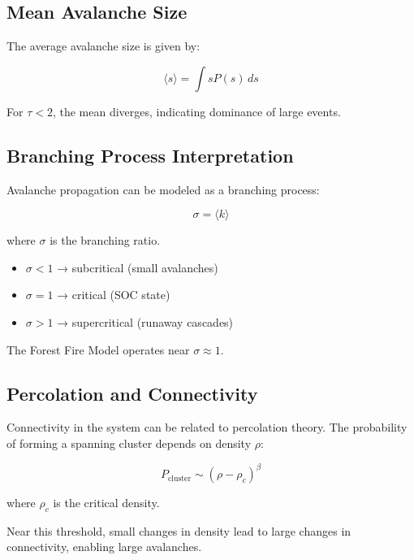 \documentclass[12pt,a4paper]{article}
\begin{document}
\subsection{Mean Avalanche Size}

The average avalanche size is given by:

\begin{equation}
\langle s \rangle = \int s P(s)\, ds
\end{equation}

For $\tau < 2$, the mean diverges, indicating dominance of large events.

\subsection{Branching Process Interpretation}

Avalanche propagation can be modeled as a branching process:

\begin{equation}
\sigma = \langle k \rangle
\end{equation}

where $\sigma$ is the branching ratio.

\begin{itemize}
\item $\sigma < 1$ → subcritical (small avalanches)
\item $\sigma = 1$ → critical (SOC state)
\item $\sigma > 1$ → supercritical (runaway cascades)
\end{itemize}

The Forest Fire Model operates near $\sigma \approx 1$.

\subsection{Percolation and Connectivity}

Connectivity in the system can be related to percolation theory. The probability of forming a spanning cluster depends on density $\rho$:

\begin{equation}
P_{\text{cluster}} \sim (\rho - \rho_c)^{\beta}
\end{equation}

where $\rho_c$ is the critical density.

Near this threshold, small changes in density lead to large changes in connectivity, enabling large avalanches.
\end{document}
